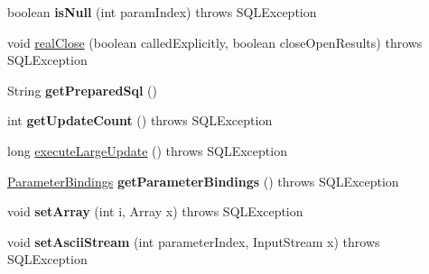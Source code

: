 \begin{DoxyCompactItemize}
\item 
\mbox{\label{classcom_1_1mysql_1_1cj_1_1jdbc_1_1_client_prepared_statement_aa3bd6acd74d7817920960edc3a656232}} 
boolean {\bfseries is\+Null} (int param\+Index)  throws S\+Q\+L\+Exception 
\item 
void \mbox{\hyperlink{classcom_1_1mysql_1_1cj_1_1jdbc_1_1_client_prepared_statement_a352b21fa4a782cfad4065a227985201a}{real\+Close}} (boolean called\+Explicitly, boolean close\+Open\+Results)  throws S\+Q\+L\+Exception 
\item 
\mbox{\label{classcom_1_1mysql_1_1cj_1_1jdbc_1_1_client_prepared_statement_aa34204b558f5f8eeec0764fbc44ef7bf}} 
String {\bfseries get\+Prepared\+Sql} ()
\item 
\mbox{\label{classcom_1_1mysql_1_1cj_1_1jdbc_1_1_client_prepared_statement_a9662d0cc90d1fe3aafc10b128162a8ed}} 
int {\bfseries get\+Update\+Count} ()  throws S\+Q\+L\+Exception 
\item 
long \mbox{\hyperlink{classcom_1_1mysql_1_1cj_1_1jdbc_1_1_client_prepared_statement_ab1ee808b8f013c4d5fed42413d32dea4}{execute\+Large\+Update}} ()  throws S\+Q\+L\+Exception 
\item 
\mbox{\label{classcom_1_1mysql_1_1cj_1_1jdbc_1_1_client_prepared_statement_ad99d10a1471bbf3f77e1b502cead7331}} 
\mbox{\hyperlink{interfacecom_1_1mysql_1_1cj_1_1jdbc_1_1_parameter_bindings}{Parameter\+Bindings}} {\bfseries get\+Parameter\+Bindings} ()  throws S\+Q\+L\+Exception 
\item 
\mbox{\label{classcom_1_1mysql_1_1cj_1_1jdbc_1_1_client_prepared_statement_a14fe19cb0e16a0829e5970728c3f025e}} 
void {\bfseries set\+Array} (int i, Array x)  throws S\+Q\+L\+Exception 
\item 
\mbox{\label{classcom_1_1mysql_1_1cj_1_1jdbc_1_1_client_prepared_statement_a35fbcae6e35e8755c79a46754337c297}} 
void {\bfseries set\+Ascii\+Stream} (int parameter\+Index, Input\+Stream x)  throws S\+Q\+L\+Exception 

\end{DoxyCompactItemize}
